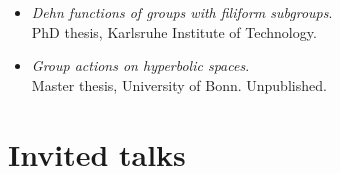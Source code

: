 \documentclass[a4paper,11pt]{article} %
\begin{document}
\begin{itemize}
    \item \emph{Dehn functions of groups with filiform subgroups}. \\
    PhD thesis, Karlsruhe Institute of Technology. 

    \item \emph{Group actions on hyperbolic spaces}. \\
    Master thesis, University of Bonn. Unpublished. 
\end{itemize}


\section{Invited talks}

\end{document}
